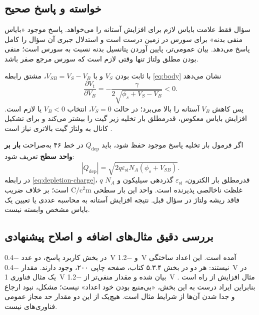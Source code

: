 \documentclass[12pt,a4paper]{article}
\newcommand{\exnum}[1]{\mbox{\beginL#1\endL}}
\newcommand{\reviewfile}[1]{\lr{\small\texttt{#1}}}
\begin{document}
\subsection*{خواسته و پاسخ صحیح}
سؤال فقط علامت بایاس لازم برای افزایش آستانه  را می‌خواهد. پاسخ موجود «بایاس منفی بدنه» برای سورس در زمین درست است و استدلال جبری آن سؤال را کامل پاسخ می‌دهد. بیان عمومی‌تر، پایین آوردن پتانسیل بدنه نسبت به سورس است؛ منفی بودن مطلق ولتاژ تنها وقتی لازم است که سورس مرجع صفر باشد.

با ثابت بودن \(V_S\) و با \(V_{SB}=V_S-V_B\)، مشتق رابطه \eqref{eq:body} نشان می‌دهد
\begin{equation}
 \frac{\partial V_t}{\partial V_B}
 =-\frac{\gamma}{2\sqrt{\phi_s+V_S-V_B}}<0.
 \label{eq:body-bias-derivative}
\end{equation}
پس کاهش \(V_B\) آستانه را بالا می‌برد؛ در حالت \(V_S=0\)، انتخاب \(V_B<0\) یا  لازم است. افزایش بایاس معکوس، قدرمطلق بار تخلیه زیر گیت را بیشتر می‌کند و برای تشکیل کانال به ولتاژ گیت بالاتری نیاز است \cite[رابطه \exnum{۲.۳۵}، صفحه چاپی ۷۹]{weste}\cite[اسلاید ۱۶]{nonideal}.

اگر فرمول بار تخلیه پاسخ موجود حفظ شود، باید \(Q_{\mathrm{dep}}\) در خط ۴۶ \reviewfile{2/solutions/2-9.tex} به‌صراحت \textbf{بار بر واحد سطح} تعریف شود:
\begin{equation}
 |Q_{\mathrm{dep}}|=\sqrt{2q\varepsilon_{\mathrm{si}}N_A(\phi_s+V_{SB})}.
 \label{eq:depletion-charge}
\end{equation}
در رابطه \eqref{eq:depletion-charge}، \(q\) قدرمطلق بار الکترون، \(\varepsilon_{\mathrm{si}}\) گذردهی سیلیکون و \(N_A\) غلظت ناخالصی پذیرنده است. واحد این بار سطحی \(\unit{\coulomb\per\square\centi\metre}\) است؛ بر خلاف ضریب فاقد ریشه ولتاژ در سؤال قبل. نتیجه افزایش آستانه به محاسبه عددی یا تعیین یک بایاس مشخص وابسته نیست.

\subsection*{بررسی دقیق مثال‌های اضافه و اصلاح پیشنهادی}
در بخش کاربرد پاسخ، دو عدد \qty{-0.4}{\volt} و \qty{-1.2}{\volt} آمده است. این اعداد ساختگی نیستند: هر دو در بخش \exnum{۵.۳.۴} کتاب، صفحه چاپی ۲۰۰، وجود دارند. مقدار \qty{-0.4}{\volt} در یک مثال فناوری \qty{1}{\volt} بیان شده و مقدار منفی‌تر از \qty{-1.2}{\volt} مثال افزایش  از راه  است \cite[صفحه ۲۲۷ فایل]{weste}. بنابراین ایراد درست به این بخش، «بی‌منبع بودن خود اعداد» نیست؛ مشکل، نبود ارجاع و جدا شدن آن‌ها از شرایط مثال است. هیچ‌یک از این دو مقدار حد مجاز عمومی فناوری‌های  نیست.
\end{document}
